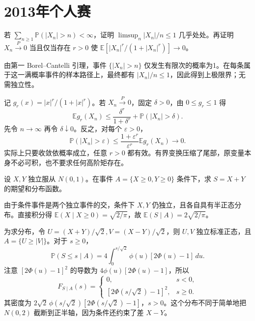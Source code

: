 \documentclass[UTF8,12pt,a4paper,fontset=fandol]{ctexbook}
\newcommand{\E}{\mathbb E}
\newcommand{\PP}{\mathbb P}
\begin{document}
\section{2013年个人赛}
\begin{example}[原题1：尾概率与有界变换]\label{yau:2013-1}
若 $\sum_{n\ge1}\PP(|X_n|>n)<\infty$，证明 $\limsup_n|X_n|/n\le1$ 几乎处处。再证明 $X_n\xrightarrow P0$ 当且仅当存在 $r>0$ 使 $\E[|X_n|^r/(1+|X_n|^r)]\to0$。
\end{example}
\begin{solve}
由第一 Borel--Cantelli 引理，事件 $\{|X_n|>n\}$ 仅发生有限次的概率为1。在每条属于这一满概率事件的样本路径上，最终都有 $|X_n|/n\le1$，因此得到上极限界；无需独立性。

记 $g_r(x)=|x|^r/(1+|x|^r)$。若 $X_n\xrightarrow P0$，固定 $\delta>0$，由 $0\le g_r\le1$ 得
\[
\E g_r(X_n)\le\frac{\delta^r}{1+\delta^r}+\PP(|X_n|>\delta).
\]
先令 $n\to\infty$ 再令 $\delta\downarrow0$。反之，对每个 $\varepsilon>0$，
\[
\PP(|X_n|>\varepsilon)\le\frac{1+\varepsilon^r}{\varepsilon^r}\E g_r(X_n)\to0.
\]
实际上只要收敛依概率成立，任意 $r>0$ 都有效。有界变换压缩了尾部，原变量本身不必可积，也不要求任何高阶矩存在。
\end{solve}

\begin{example}[原题2：两个正态变量在第一象限内的和]\label{yau:2013-2}
设 $X,Y$ 独立服从 $N(0,1)$。在事件 $A=\{X\ge0,Y\ge0\}$ 条件下，求 $S=X+Y$ 的期望和分布函数。
\end{example}
\begin{solve}
由于条件事件是两个独立事件的交，条件下 $X,Y$ 仍独立，且各自具有半正态分布。直接积分得 $\E(X\mid X\ge0)=\sqrt{2/\pi}$，故 $\E(S\mid A)=2\sqrt{2/\pi}$。

为求分布，令 $U=(X+Y)/\sqrt2,V=(X-Y)/\sqrt2$，则 $U,V$ 独立标准正态，且 $A=\{U\ge|V|\}$。对于 $s\ge0$，
\[
\PP(S\le s\mid A)=4\int_0^{s/\sqrt2}\phi(u)[2\Phi(u)-1]\,du.
\]
注意 $[2\Phi(u)-1]^2$ 的导数为 $4\phi(u)[2\Phi(u)-1]$，所以
\[
F_{S\mid A}(s)=\begin{cases}0,&s<0,\\{}[2\Phi(s/\sqrt2)-1]^2,&s\ge0.\end{cases}
\]
其密度为 $2\sqrt2\,\phi(s/\sqrt2)[2\Phi(s/\sqrt2)-1]$，$s>0$。这个分布不同于简单地把 $N(0,2)$ 截断到正半轴，因为条件还约束了差 $X-Y$。
\end{solve}
\end{document}
